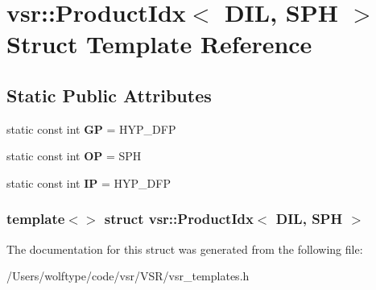 \hypertarget{structvsr_1_1_product_idx_3_01_d_i_l_00_01_s_p_h_01_4}{\section{vsr\-:\-:Product\-Idx$<$ D\-I\-L, S\-P\-H $>$ Struct Template Reference}
\label{structvsr_1_1_product_idx_3_01_d_i_l_00_01_s_p_h_01_4}
}
\subsection*{Static Public Attributes}
\begin{DoxyCompactItemize}
\item 
\hypertarget{structvsr_1_1_product_idx_3_01_d_i_l_00_01_s_p_h_01_4_ab31bea7038684e67e7d7f5587a6de974}{static const int {\bfseries G\-P} = H\-Y\-P\-\_\-\-D\-F\-P}\label{structvsr_1_1_product_idx_3_01_d_i_l_00_01_s_p_h_01_4_ab31bea7038684e67e7d7f5587a6de974}

\item 
\hypertarget{structvsr_1_1_product_idx_3_01_d_i_l_00_01_s_p_h_01_4_ae376d751979d9e9bc143c30c84589471}{static const int {\bfseries O\-P} = S\-P\-H}\label{structvsr_1_1_product_idx_3_01_d_i_l_00_01_s_p_h_01_4_ae376d751979d9e9bc143c30c84589471}

\item 
\hypertarget{structvsr_1_1_product_idx_3_01_d_i_l_00_01_s_p_h_01_4_a72f72064a0ae037e6267118871567f66}{static const int {\bfseries I\-P} = H\-Y\-P\-\_\-\-D\-F\-P}\label{structvsr_1_1_product_idx_3_01_d_i_l_00_01_s_p_h_01_4_a72f72064a0ae037e6267118871567f66}

\end{DoxyCompactItemize}
\subsubsection*{template$<$$>$ struct vsr\-::\-Product\-Idx$<$ D\-I\-L, S\-P\-H $>$}



The documentation for this struct was generated from the following file\-:\begin{DoxyCompactItemize}
\item 
/\-Users/wolftype/code/vsr/\-V\-S\-R/vsr\-\_\-templates.\-h\end{DoxyCompactItemize}
